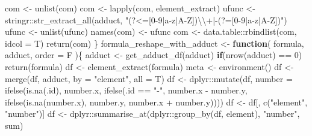 \documentclass[
]{article}
\newenvironment{Shaded}{\begin{snugshade}}{\end{snugshade}}
\newcommand{\AttributeTok}[1]{\textcolor[rgb]{0.77,0.63,0.00}{#1}}
\newcommand{\ControlFlowTok}[1]{\textcolor[rgb]{0.13,0.29,0.53}{\textbf{#1}}}
\newcommand{\DecValTok}[1]{\textcolor[rgb]{0.00,0.00,0.81}{#1}}
\newcommand{\FunctionTok}[1]{\textcolor[rgb]{0.00,0.00,0.00}{#1}}
\newcommand{\NormalTok}[1]{#1}
\newcommand{\OtherTok}[1]{\textcolor[rgb]{0.56,0.35,0.01}{#1}}
\newcommand{\SpecialCharTok}[1]{\textcolor[rgb]{0.00,0.00,0.00}{#1}}
\newcommand{\StringTok}[1]{\textcolor[rgb]{0.31,0.60,0.02}{#1}}
\begin{document}
\begin{Shaded}
\begin{Highlighting}[]
\NormalTok{    com }\OtherTok{\textless{}{-}} \FunctionTok{unlist}\NormalTok{(com)}
\NormalTok{    com }\OtherTok{\textless{}{-}} \FunctionTok{lapply}\NormalTok{(com, element\_extract)}
\NormalTok{    ufunc }\OtherTok{\textless{}{-}}\NormalTok{ stringr}\SpecialCharTok{::}\FunctionTok{str\_extract\_all}\NormalTok{(adduct, }\StringTok{"(?\textless{}=[0{-}9|a{-}z|A{-}Z])}\SpecialCharTok{\textbackslash{}\textbackslash{}}\StringTok{+|{-}(?=[0{-}9|a{-}z|A{-}Z])"}\NormalTok{)}
\NormalTok{    ufunc }\OtherTok{\textless{}{-}} \FunctionTok{unlist}\NormalTok{(ufunc)}
    \FunctionTok{names}\NormalTok{(com) }\OtherTok{\textless{}{-}}\NormalTok{ ufunc}
\NormalTok{    com }\OtherTok{\textless{}{-}}\NormalTok{ data.table}\SpecialCharTok{::}\FunctionTok{rbindlist}\NormalTok{(com, }\AttributeTok{idcol =}\NormalTok{ T)}
    \FunctionTok{return}\NormalTok{(com)}
\NormalTok{  \}}
\NormalTok{formula\_reshape\_with\_adduct }\OtherTok{\textless{}{-}} 
  \ControlFlowTok{function}\NormalTok{(}
\NormalTok{    formula,}
\NormalTok{    adduct,}
    \AttributeTok{order =}\NormalTok{ F}
\NormalTok{    )\{}
\NormalTok{    adduct }\OtherTok{\textless{}{-}} \FunctionTok{get\_adduct\_df}\NormalTok{(adduct)}
    \ControlFlowTok{if}\NormalTok{(}\FunctionTok{nrow}\NormalTok{(adduct) }\SpecialCharTok{==} \DecValTok{0}\NormalTok{)}
      \FunctionTok{return}\NormalTok{(formula)}
\NormalTok{    df }\OtherTok{\textless{}{-}} \FunctionTok{element\_extract}\NormalTok{(formula)}
\NormalTok{    meta }\OtherTok{\textless{}{-}} \FunctionTok{environment}\NormalTok{()}
\NormalTok{    df }\OtherTok{\textless{}{-}} \FunctionTok{merge}\NormalTok{(df, adduct, }\AttributeTok{by =} \StringTok{"element"}\NormalTok{, }\AttributeTok{all =}\NormalTok{ T)}
\NormalTok{    df }\OtherTok{\textless{}{-}}\NormalTok{ dplyr}\SpecialCharTok{::}\FunctionTok{mutate}\NormalTok{(df, }\AttributeTok{number =} \FunctionTok{ifelse}\NormalTok{(}\FunctionTok{is.na}\NormalTok{(.id), number.x,}
        \FunctionTok{ifelse}\NormalTok{(.id }\SpecialCharTok{==} \StringTok{"{-}"}\NormalTok{, number.x }\SpecialCharTok{{-}}\NormalTok{ number.y,}
          \FunctionTok{ifelse}\NormalTok{(}\FunctionTok{is.na}\NormalTok{(number.x), number.y, number.x }\SpecialCharTok{+}\NormalTok{ number.y))))}
\NormalTok{    df }\OtherTok{\textless{}{-}}\NormalTok{ df[, }\FunctionTok{c}\NormalTok{(}\StringTok{"element"}\NormalTok{, }\StringTok{"number"}\NormalTok{)]}
\NormalTok{    df }\OtherTok{\textless{}{-}}\NormalTok{ dplyr}\SpecialCharTok{::}\FunctionTok{summarise\_at}\NormalTok{(dplyr}\SpecialCharTok{::}\FunctionTok{group\_by}\NormalTok{(df, element), }\StringTok{"number"}\NormalTok{, sum)}

\end{Highlighting}
\end{Shaded}
\end{document}
